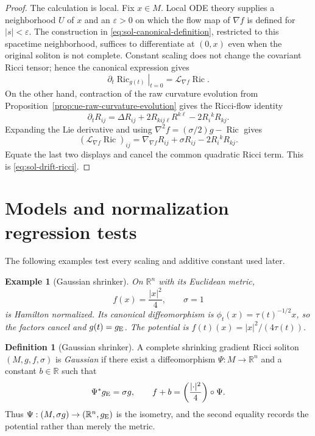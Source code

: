 \documentclass[10pt]{coll-l}
\newtheorem{example}[theorem]{Example}
\theoremstyle{definition}
\newtheorem{definition}[theorem]{Definition}
\theoremstyle{remark}
\numberwithin{section}{chapter}
\numberwithin{equation}{chapter}
\newcommand{\Ric}{\operatorname{Ric}}
\begin{document}
\begin{proof}
The calculation is local.  Fix $x\in M$.  Local ODE theory supplies a
neighborhood $U$ of $x$ and an $\varepsilon>0$ on which the flow map of
$\nabla f$ is defined for $|s|<\varepsilon$.  The construction in
\eqref{eq:sol-canonical-definition}, restricted to this spacetime
neighborhood, suffices to differentiate at $(0,x)$ even when the original
soliton is not complete.  Constant scaling does not change the covariant
Ricci tensor; hence the canonical expression gives
\[
       \left.\partial_t\Ric_{g(t)}\right|_{t=0}
          =\mathcal L_{\nabla f}\Ric.
\]
On the other hand, contraction of the raw curvature evolution from
Proposition~\ref{prop:ue-raw-curvature-evolution} gives the Ricci-flow
identity
\[
 \partial_tR_{ij}
   =\Delta R_{ij}+2R_{kij\ell}R^{k\ell}-2R_i{}^kR_{kj}.
\]
Expanding the Lie derivative and using
$\nabla^2f=(\sigma/2)g-\Ric$ gives
\[
 (\mathcal L_{\nabla f}\Ric)_{ij}
   =\nabla_{\nabla f}R_{ij}+\sigma R_{ij}-2R_i{}^kR_{kj}.
\]
Equate the last two displays and cancel the common quadratic Ricci term.
This is \eqref{eq:sol-drift-ricci}.
\end{proof}

\section{Models and normalization regression tests}
\label{sec:sol-models}

The following examples test every scaling and additive constant used later.

\begin{example}[Gaussian shrinker]
\label{ex:sol-gaussian}
On $\mathbb R^n$ with its Euclidean metric,
\[
               f(x)=\frac{|x|^2}{4},\qquad \sigma=1
\]
is Hamilton normalized.  Its canonical diffeomorphism is
$\phi_t(x)=\tau(t)^{-1/2}x$, so the factors cancel and $g(t)=g_{\rm E}$.
The potential is $f(t)(x)=|x|^2/(4\tau(t))$.
\end{example}

\begin{definition}[Gaussian shrinker]
\label{def:sol-gaussian}
A complete shrinking gradient Ricci soliton $(M,g,f,\sigma)$ is
\emph{Gaussian} if there exist a diffeomorphism
$\Psi:M\to\mathbb R^n$ and a constant $b\in\mathbb R$ such that
\begin{equation}
       \Psi^*g_{\rm E}=\sigma g,
       \qquad
       f+b=\left(\frac{|\mathord\cdot|^2}{4}\right)\circ\Psi. \label{eq:sol-gaussian-witnesses}
\end{equation}
Thus $\Psi:(M,\sigma g)\to(\mathbb R^n,g_{\rm E})$ is the isometry, and the
second equality records the potential rather than merely the metric.
\end{definition}
\end{document}

